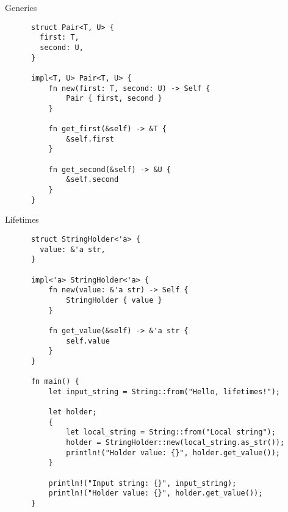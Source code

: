 \documentclass{beamer}
\begin{document}
\begin{frame}[fragile]{Generics}
  \begin{listing}
    \begin{verbatim}
      struct Pair<T, U> {
        first: T,
        second: U,
      }
    
      impl<T, U> Pair<T, U> {
          fn new(first: T, second: U) -> Self {
              Pair { first, second }
          }
      
          fn get_first(&self) -> &T {
              &self.first
          }
      
          fn get_second(&self) -> &U {
              &self.second
          }
      }
    \end{verbatim}
  \end{listing}
\end{frame}

\begin{frame}[fragile]{Lifetimes}
  \begin{listing}
    \begin{verbatim}
      struct StringHolder<'a> {
        value: &'a str,
      }
      
      impl<'a> StringHolder<'a> {
          fn new(value: &'a str) -> Self {
              StringHolder { value }
          }
      
          fn get_value(&self) -> &'a str {
              self.value
          }
      }
      
      fn main() {
          let input_string = String::from("Hello, lifetimes!");
      
          let holder;
          {
              let local_string = String::from("Local string");
              holder = StringHolder::new(local_string.as_str());
              println!("Holder value: {}", holder.get_value());
          }
      
          println!("Input string: {}", input_string);
          println!("Holder value: {}", holder.get_value());
      }
    \end{verbatim}
  \end{listing}
\end{frame}
\end{document}
